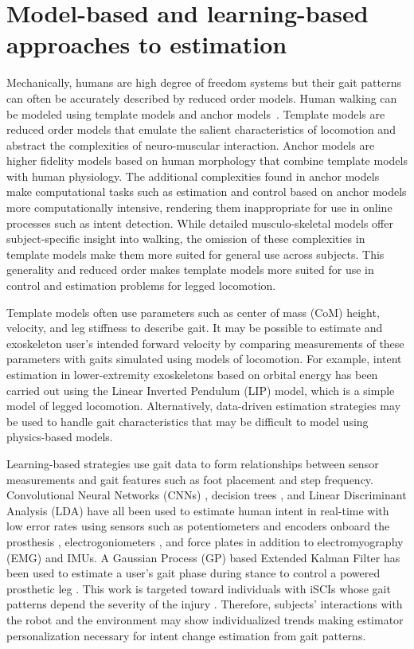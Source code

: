 \section{Model-based and learning-based approaches to estimation}

Mechanically, humans are high degree of freedom systems but their gait patterns can often be accurately described by reduced order models. Human walking can be modeled using template models and anchor models~\cite{full1999templates}. Template models are reduced order models that emulate the salient characteristics of locomotion and abstract the complexities of neuro-muscular interaction. Anchor models are higher fidelity models based on human morphology that combine template models with human physiology. The additional complexities found in anchor models make computational tasks such as estimation and control based on anchor models more computationally intensive, rendering them inappropriate for use in online processes such as intent detection. While detailed musculo-skeletal models offer subject-specific insight into walking, the omission of these complexities in template models make them more suited for general use across subjects. This generality and reduced order makes template models more suited for use in control and estimation problems for legged locomotion.

Template models often use parameters such as center of mass (CoM) height, velocity, and leg stiffness to describe gait. It may be possible to estimate and exoskeleton user's intended forward velocity by comparing measurements of these parameters with gaits simulated using models of locomotion. For example, intent estimation in lower-extremity exoskeletons based on orbital energy \cite{chen2018dynamic} has been carried out using the Linear Inverted Pendulum (LIP) model, which is a simple model of legged locomotion.  Alternatively, data-driven estimation strategies \cite{ge2011neural, kalinowska2019data, joukov2017rhythmic} may be used to handle gait characteristics that may be difficult to model using physics-based models.

Learning-based strategies use gait data to form relationships between sensor measurements and gait features such as foot placement and step frequency. Convolutional Neural Networks (CNNs) \cite{lee2020image}, decision trees \cite{moolchandani2021design}, and Linear Discriminant Analysis (LDA) \cite{young2013classifying}  have all been used to estimate human intent in real-time with low error rates using sensors such as potentiometers and encoders onboard the prosthesis \cite{young2013classifying}, electrogoniometers \cite{lee2020image}, and force plates \cite{moolchandani2021design} in addition to  electromyography (EMG) and IMUs. A Gaussian Process (GP) based Extended Kalman Filter has been used to estimate a user's gait phase during stance to control a powered prosthetic leg \cite{thatte2019robust}. This work is targeted toward individuals with iSCIs whose gait patterns depend the severity of the injury \cite{rota2011walk}. Therefore, subjects' interactions with the robot and the environment may show individualized trends making estimator personalization necessary for intent change estimation from gait patterns. 

